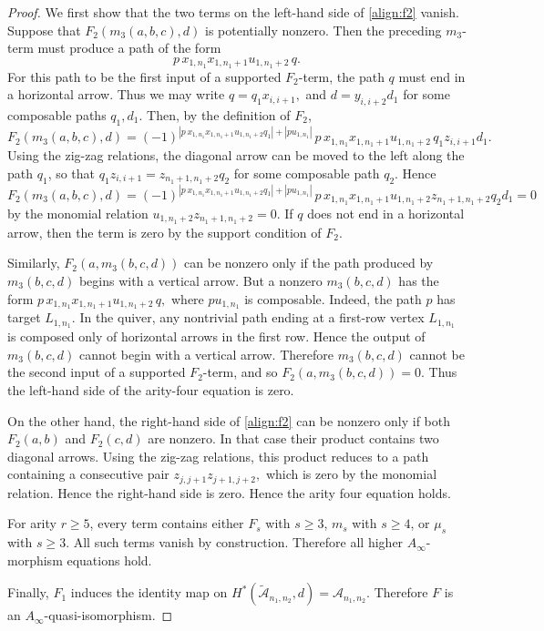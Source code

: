\documentclass[a4paper, reqno, 11pt]{amsart}
\theoremstyle{definition}
\begin{document}
\begin{proof}
	
	We first show that the two terms on the left-hand side of \eqref{align:f2} vanish. Suppose that
	\(F_2(m_3(a,b,c),d)\) is potentially nonzero. Then the preceding \(m_3\)-term
	must produce a path of the form
	\[
	p\,x_{1,n_1}x_{1,n_1+1}u_{1,n_1+2}\,q.
	\]
	For this path to be the first input of a supported \(F_2\)-term, the path \(q\)
	must end in a horizontal arrow. Thus we may write \(q=q_1x_{i,i+1},\) and \( d=y_{i,i+2}d_1\)
	for some composable paths \(q_1,d_1\). Then, by the definition of \(F_2\),
	\[
	F_2(m_3(a,b,c),d)
	=
	(-1)^{|p\,x_{1,n_1}x_{1,n_1+1}u_{1,n_1+2}q_1|+|p u_{1,n_1}|}\,p\,x_{1,n_1}x_{1,n_1+1}u_{1,n_1+2}\,q_1z_{i,i+1}d_1.
	\]
	Using the zig-zag relations, the diagonal arrow can be moved to the left along
	the path \(q_1\), so that \(q_1z_{i,i+1}=z_{n_1+1,n_1+2}q_2\) for some composable path \(q_2\). Hence
	\[
	F_2(m_3(a,b,c),d)
	=
	(-1)^{|p\,x_{1,n_1}x_{1,n_1+1}u_{1,n_1+2}q_1|+|p u_{1,n_1}|}\,p\,x_{1,n_1}x_{1,n_1+1}u_{1,n_1+2}z_{n_1+1,n_1+2}q_2d_1
	=0
	\]
	by the monomial relation \(u_{1,n_1+2}z_{n_1+1,n_1+2}=0\). If \(q\) does not
	end in a horizontal arrow, then the term is zero by the support condition of
	\(F_2\).
	
	Similarly, \(F_2(a,m_3(b,c,d))\) can be nonzero only if the path produced by
	\(m_3(b,c,d)\) begins with a vertical arrow. But a nonzero \(m_3(b,c,d)\) has
	the form \(p\,x_{1,n_1}x_{1,n_1+1}u_{1,n_1+2}\,q,\)
	where \(p u_{1,n_1}\) is composable. Indeed, the path \(p\) has target \(L_{1,n_1}\). In the quiver, any nontrivial path ending at a first-row vertex \(L_{1,n_1}\) is composed only of horizontal arrows in the first row. Hence the output of \(m_3(b,c,d)\) cannot begin with a vertical arrow. Therefore \(m_3(b,c,d)\) cannot be the second input of a supported \(F_2\)-term, and so
	\(
	F_2(a,m_3(b,c,d))=0.
	\)
	Thus the left-hand side of the arity-four equation is zero.
	
	On the other hand, the right-hand side of \eqref{align:f2}  can be nonzero only if both \(F_2(a,b)\) and \(F_2(c,d)\) are nonzero. In that case their product contains two diagonal arrows. Using the zig-zag relations, this product reduces to a path containing a consecutive pair \(z_{j,j+1}z_{j+1,j+2},\) which is zero by the monomial relation. Hence the right-hand side is zero. Hence
	the arity four equation holds.
	
	For arity \(r\ge 5\), every term contains either \(F_s\) with \(s\ge 3\),
	\(m_s\) with \(s\ge 4\), or \(\mu_s\) with \(s\ge 3\). All such terms vanish by
	construction. Therefore all higher \(A_\infty\)-morphism equations hold.
	
	Finally, \(F_1\) induces the identity map on \(H^\ast(\widetilde{\mathcal A}_{n_1,n_2},d)=\mathcal A_{n_1,n_2}.\) Therefore \(F\) is an \(A_\infty\)-quasi-isomorphism.
\end{proof}
\end{document}
